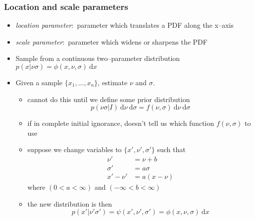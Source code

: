 \documentclass[../jaynes_prob_theory_notes.tex]{subfiles}
\begin{document}
            \subsubsection{Location and scale parameters}
                \begin{itemize} 
                    \item \textit{location parameter}:\ parameter which translates a PDF along the x--axis
                    \item \textit{scale parameter}:\ parameter which widens or sharpens the PDF
                    \item Sample from a continuous two--parameter distribution \( p(x|{\nu}{\sigma}) = {\phi}(x, \nu, \sigma)~\text{d}x \)
                    \item Given a sample \( \{x_1, \ldots, x_n \} \), estimate \( \nu \) and \( \sigma \).
                        \begin{itemize} 
                            \item cannot do this until we define some prior distribution
                                \begin{equation*} 
                                    p({\nu}{\sigma}|I)~\text{d}\nu~\text{d}\sigma = f(\nu, \sigma)~\text{d}\nu~\text{d}\sigma
                                \end{equation*}
                            \item if in complete initial ignorance, doesn't tell us which function \( f(\nu, \sigma) \) to use
                            \item suppose we change variables to \( \{x', \nu', \sigma' \}\) such that
                                \begin{align*}
                                    \nu' &= \nu + b \\
                                    \sigma' &= a \sigma \\
                                    x' - \nu' &= a(x - \nu)
                                \end{align*}
                                where \( (0 < a < \infty) \) and \( (-\infty < b < \infty) \)
                            \item the new distribution is then
                                \begin{equation*} 
                                    p(x'|\nu' \sigma') = \psi(x', \nu', \sigma') = \phi(x, \nu, \sigma)~\text{d}x
                                \end{equation*}

\end{itemize}
\end{itemize}
\end{document}
